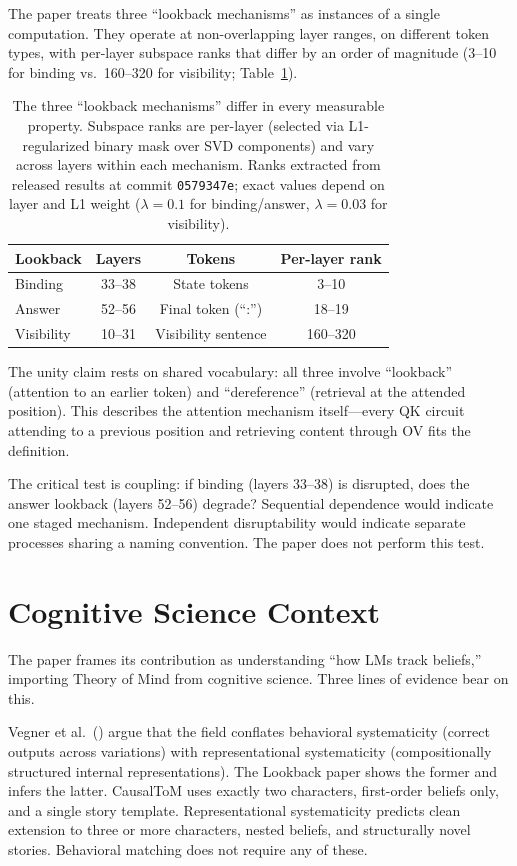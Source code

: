 \documentclass{article}
\begin{document}
The paper treats three ``lookback mechanisms'' as instances of a single computation. They operate at non-overlapping layer ranges, on different token types, with per-layer subspace ranks that differ by an order of magnitude (3--10 for binding vs.\ 160--320 for visibility; Table~\ref{tab:unity}).

\begin{table}[t]
\centering
\caption{The three ``lookback mechanisms'' differ in every measurable property. Subspace ranks are per-layer (selected via L1-regularized binary mask over SVD components) and vary across layers within each mechanism. Ranks extracted from released results at commit \texttt{0579347e}; exact values depend on layer and L1 weight ($\lambda = 0.1$ for binding/answer, $\lambda = 0.03$ for visibility).}
\label{tab:unity}
\begin{tabular}{lccc}
\toprule
Lookback & Layers & Tokens & Per-layer rank \\
\midrule
Binding & 33--38 & State tokens & 3--10 \\
Answer & 52--56 & Final token (``:'') & 18--19 \\
Visibility & 10--31 & Visibility sentence & 160--320 \\
\bottomrule
\end{tabular}
\end{table}

The unity claim rests on shared vocabulary: all three involve ``lookback'' (attention to an earlier token) and ``dereference'' (retrieval at the attended position). This describes the attention mechanism itself---every QK circuit attending to a previous position and retrieving content through OV fits the definition.

The critical test is coupling: if binding (layers 33--38) is disrupted, does the answer lookback (layers 52--56) degrade? Sequential dependence would indicate one staged mechanism. Independent disruptability would indicate separate processes sharing a naming convention. The paper does not perform this test.


\section{Cognitive Science Context}
\label{sec:cogsci}

The paper frames its contribution as understanding ``how LMs track beliefs,'' importing Theory of Mind from cognitive science. Three lines of evidence bear on this.

Vegner et al.\ (\citeyear{vegner2025systematicity}) argue that the field conflates behavioral systematicity (correct outputs across variations) with representational systematicity (compositionally structured internal representations). The Lookback paper shows the former and infers the latter. CausalToM uses exactly two characters, first-order beliefs only, and a single story template. Representational systematicity predicts clean extension to three or more characters, nested beliefs, and structurally novel stories. Behavioral matching does not require any of these.
\end{document}
